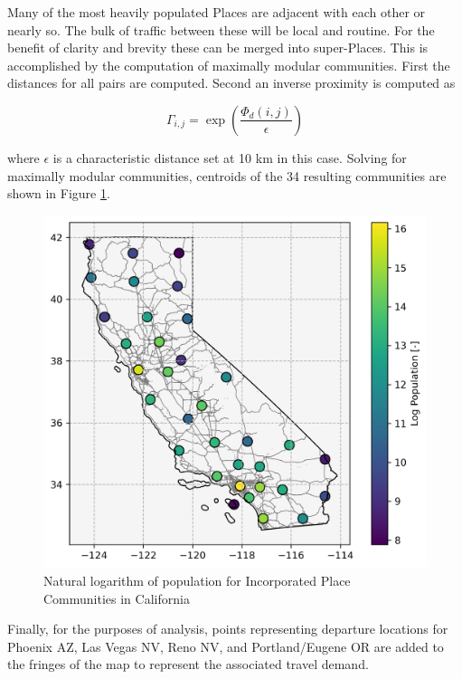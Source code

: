 Many of the most heavily populated Places are adjacent with each other or nearly so. The bulk of traffic between these will be local and routine. For the benefit of clarity and brevity these can be merged into super-Places. This is accomplished by the computation of maximally modular communities. First the distances for all pairs are computed. Second an inverse proximity is computed as

\begin{equation}
	\Gamma_{i,j} = \exp{\left(\frac{\Phi_d(i,j)}{\epsilon}\right)}
\end{equation}

where $\epsilon$ is a characteristic distance set at 10 km in this case. Solving for maximally modular communities, centroids of the 34 resulting communities are shown in Figure \ref{fig:california_incorporated_communities}.

\begin{figure}[H]
	\centering
	\includegraphics[width = \linewidth]{figs/california_incorporated_communities.png}
	\caption{Natural logarithm  of population for Incorporated Place Communities in California}
	\label{fig:california_incorporated_communities}
\end{figure}

Finally, for the purposes of analysis, points representing departure locations for Phoenix AZ, Las Vegas NV, Reno NV, and Portland/Eugene OR are added to the fringes of the map to represent the associated travel demand.

